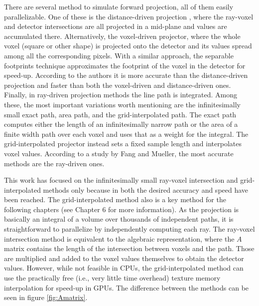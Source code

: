 There are several method to simulate forward projection, all of them easily parallelizable. One of these is the distance-driven projection \cite{BrunoDeMan}\cite{schlifske2016fast}, where the ray-voxel and detector intersections are all projected in a mid-plane and values are accumulated there. Alternatively, the voxel-driven projector\cite{Du2017}, where the whole voxel (square or other shape\cite{lewitt1992alternatives}) is projected onto the detector and its values spread among all the corresponding pixels. With a similar approach, the separable footprints technique\cite{long20103d}\cite{wu2011gpu} approximates the footprint of the voxel in the detector for speed-up.  According to the authors it is more accurate than the distance-driven projection and faster than both the voxel-driven and distance-driven ones. Finally, in ray-driven projection\cite{siddon1985fast}\cite{xu2010fast}\cite{chou2011fast} methods the line path is integrated. Among these, the most important variations worth mentioning are the infinitesimally small exact path, area path, and the grid-interpolated path. The exact path computes either the length of an infinitesimally narrow path or the area of a finite width path over each voxel and uses that as a weight for the integral. The grid-interpolated projector instead sets a fixed sample length and interpolates voxel values. According to a study by Fang and Mueller\cite{1625152}, the most accurate methods are the ray-driven ones.

This work has focused on the infinitesimally small ray-voxel intersection and grid-interpolated methods only because in both the desired accuracy and speed have been reached. The grid-interpolated method also is a key method for the following chapters (see Chapter 6 for more information). As the projection is basically an integral of a volume over thousands of independent paths, it is straightforward to parallelize by independently computing each ray. The ray-voxel intersection method is equivalent to the algebraic representation, where the $A$ matrix contains the length of the intersection between voxels and the path. Those are multiplied and added to the voxel values themselves to obtain the detector values. However, while not feasible in CPUs, the grid-interpolated method can use the practically free (i.e., very little time overhead) texture memory interpolation for speed-up in GPUs. The difference between the methods can be seen in figure \ref{fig:Amatrix}. 

